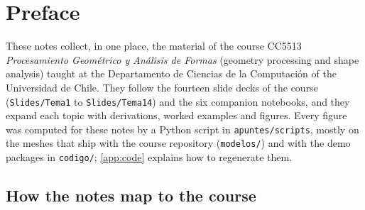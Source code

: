 \chapter*{Preface}

These notes collect, in one place, the material of the course CC5513 \emph{Procesamiento
Geom\'etrico y An\'alisis de Formas} (geometry processing and shape analysis) taught at the
Departamento de Ciencias de la Computaci\'on of the Universidad de Chile. They follow the fourteen
slide decks of the course (\texttt{Slides/Tema1} to \texttt{Slides/Tema14}) and the six companion
notebooks, and they expand each topic with derivations, worked examples and figures. Every figure
was computed for these notes by a Python script in \texttt{apuntes/scripts}, mostly on the meshes
that ship with the course repository (\texttt{modelos/}) and with the demo packages in
\texttt{codigo/}; \cref{app:code} explains how to regenerate them.

\section*{How the notes map to the course}


